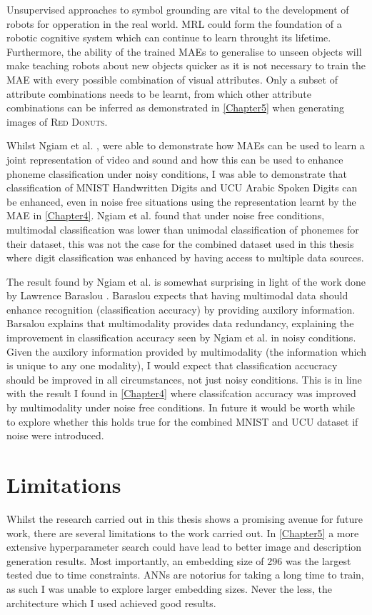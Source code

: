 Unsupervised approaches to symbol grounding are vital to the development of robots for opperation in the real world. \ac{MRL} could form the foundation of a robotic cognitive system which can continue to learn throught its lifetime. Furthermore, the ability of the trained \acp{MAE} to generalise to unseen objects will make teaching robots about new objects quicker as it is not necessary to train the \ac{MAE} with every possible combination of visual attributes. Only a subset of attribute combinations needs to be learnt, from which other attribute combinations can be inferred as demonstrated in \autoref{Chapter5} when generating images of \textsc{Red Donuts}.

Whilst Ngiam et al. \cite{ngiam2011multimodal}, were able to demonstrate how \acp{MAE} can be used to learn a joint representation of video and sound and how this can be used to enhance phoneme classification under noisy conditions, I was able to demonstrate that classification of MNIST Handwritten Digits and UCU Arabic Spoken Digits can be enhanced, even in noise free situations using the representation learnt by the \ac{MAE} in \autoref{Chapter4}. Ngiam et al. found that under noise free conditions, multimodal classification was lower than unimodal classification of phonemes for their dataset, this was not the case for the combined dataset used in this thesis where digit classification was enhanced by having access to multiple data sources.

The result found by Ngiam et al. \cite{ngiam2011multimodal} is somewhat surprising in light of the work done by Lawrence Baraslou \cite{barsalou2008grounded}. Baraslou expects that having multimodal data should enhance recognition (classification accuracy) by providing auxilory information. Barsalou explains that multimodality provides data redundancy, explaining the improvement in classification accuracy seen by Ngiam et al. in noisy conditions. Given the auxilory information provided by multimodality (the information which is unique to any one modality), I would expect that classification accucracy should be improved in all circumstances, not just noisy conditions. This is in line with the result I found in \autoref{Chapter4} where classifcation accuracy was improved by multimodality under noise free conditions. In future it would be worth while to explore whether this holds true for the combined MNIST and UCU dataset if noise were introduced.

\section{Limitations}
Whilst the research carried out in this thesis shows a promising avenue for future work, there are several limitations to the work carried out. In \autoref{Chapter5} a more extensive hyperparameter search could have lead to better image and description generation results. Most importantly, an embedding size of 296 was the largest tested due to time constraints. \aclp{ANN} are notorius for taking a long time to train, as such I was unable to explore larger embedding sizes. Never the less, the architecture which I used achieved good results.

